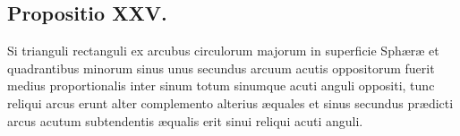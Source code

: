 \documentclass[11pt,a4paper]{article}
\begin{document}
\subsection*{Propositio XXV.}

Si trianguli rectanguli ex arcubus circulorum majorum in superficie Sphæræ et quadrantibus minorum sinus unus secundus arcuum acutis oppositorum fuerit medius proportionalis inter sinum totum sinumque acuti anguli oppositi, tunc reliqui arcus erunt alter complemento alterius æquales et sinus secundus prædicti arcus acutum subtendentis æqualis erit sinui reliqui acuti anguli.
\end{document}
